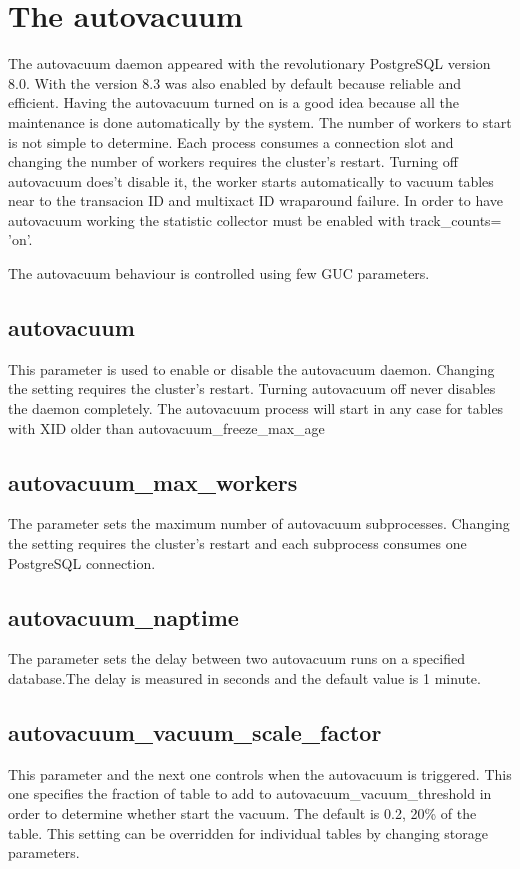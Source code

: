 \section{The autovacuum}
\label{sec:AUTOVACUUM}
The autovacuum daemon appeared with the revolutionary PostgreSQL version 8.0. With the version 8.3 
was also enabled by default because reliable and efficient. Having the autovacuum turned on is a 
good idea because all the maintenance is done automatically by the system. The number of workers to 
start is not simple to determine. Each process consumes a connection slot and changing the 
number of workers requires the cluster's restart. Turning off autovacuum does't disable it, the 
worker starts automatically to vacuum tables near to the transacion ID and multixact ID wraparound 
failure. In order to have autovacuum working the statistic collector must be enabled with 
track\_counts= 'on'.\newline


The autovacuum behaviour is controlled using few GUC parameters.

\subsection{autovacuum} 
This parameter is used to enable or disable the autovacuum daemon. Changing the setting requires 
the cluster's restart. Turning autovacuum off never disables the daemon completely. The autovacuum 
process will start in any case for tables with XID older than autovacuum\_freeze\_max\_age

\subsection{autovacuum\_max\_workers} 
The parameter sets the maximum number of autovacuum subprocesses. Changing the setting requires the 
cluster's restart and each subprocess consumes one PostgreSQL connection.

\subsection{autovacuum\_naptime} 
The parameter sets the delay between two autovacuum runs on a specified database.The delay is 
measured in seconds and the default value is 1 minute.


\subsection{autovacuum\_vacuum\_scale\_factor}
This parameter and the next one controls when the autovacuum is triggered. This one specifies the 
fraction of table to add to autovacuum\_vacuum\_threshold in order to determine whether start the 
vacuum. The default is 0.2,  20\% of the table. This setting can be overridden for individual 
tables by changing storage parameters.

